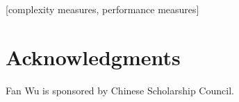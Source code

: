 \documentclass{sig-alternate}
\begin{document}
[complexity measures, performance measures]













\section{Acknowledgments}
Fan Wu is sponsored by Chinese Scholarship Council.

%
\small

%
%

\balancecolumns
\end{document}
